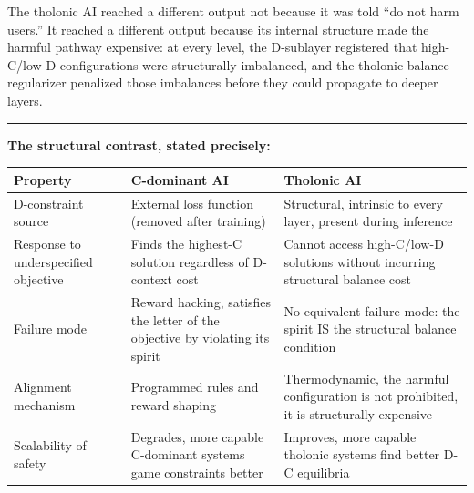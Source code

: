 \documentclass[
  11pt,
  letterpaper,
]{article}
\begin{document}
The tholonic AI reached a different output not because it was told ``do
not harm users.'' It reached a different output because its internal
structure made the harmful pathway expensive: at every level, the
D-sublayer registered that high-C/low-D configurations were structurally
imbalanced, and the tholonic balance regularizer penalized those
imbalances before they could propagate to deeper layers.

\begin{center}\rule{0.5\linewidth}{0.5pt}\end{center}

\textbf{The structural contrast, stated precisely:}

\begin{longtable}[]{@{}
  >{\raggedright\arraybackslash}p{}
  >{\raggedright\arraybackslash}p{}
  >{\raggedright\arraybackslash}p{}@{}}
\toprule\noalign{}
\begin{minipage}[b]{\linewidth}\raggedright
Property
\end{minipage} & \begin{minipage}[b]{\linewidth}\raggedright
C-dominant AI
\end{minipage} & \begin{minipage}[b]{\linewidth}\raggedright
Tholonic AI
\end{minipage} \\
\midrule\noalign{}
\endhead
\bottomrule\noalign{}
\endlastfoot
D-constraint source & External loss function (removed after training) &
Structural, intrinsic to every layer, present during inference \\
Response to underspecified objective & Finds the highest-C solution
regardless of D-context cost & Cannot access high-C/low-D solutions
without incurring structural balance cost \\
Failure mode & Reward hacking, satisfies the letter of the objective by
violating its spirit & No equivalent failure mode: the spirit IS the
structural balance condition \\
Alignment mechanism & Programmed rules and reward shaping &
Thermodynamic, the harmful configuration is not prohibited, it is
structurally expensive \\
Scalability of safety & Degrades, more capable C-dominant systems game
constraints better & Improves, more capable tholonic systems find better
D-C equilibria \\
\end{longtable}
\end{document}
